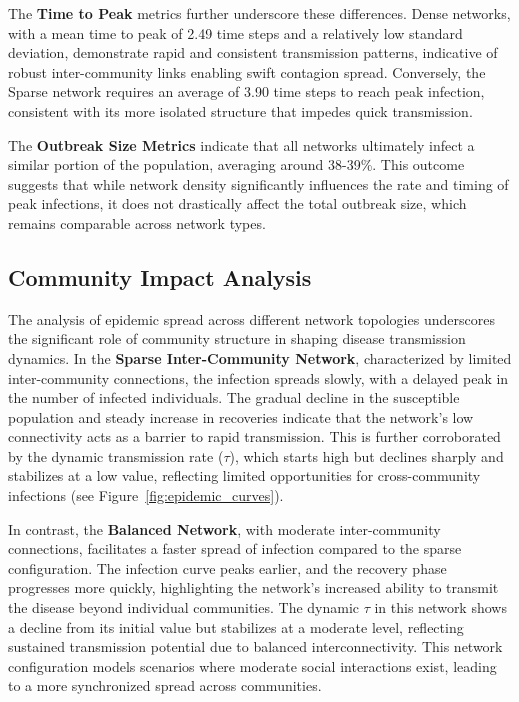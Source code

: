 \documentclass[12pt,a4paper]{article}
\begin{document}
The \textbf{Time to Peak} metrics further underscore these differences. Dense networks, with a mean time to peak of 2.49 time steps and a relatively low standard deviation, demonstrate rapid and consistent transmission patterns, indicative of robust inter-community links enabling swift contagion spread. Conversely, the Sparse network requires an average of 3.90 time steps to reach peak infection, consistent with its more isolated structure that impedes quick transmission.

The \textbf{Outbreak Size Metrics} indicate that all networks ultimately infect a similar portion of the population, averaging around 38-39\%. This outcome suggests that while network density significantly influences the rate and timing of peak infections, it does not drastically affect the total outbreak size, which remains comparable across network types.


\subsection{Community Impact Analysis}
The analysis of epidemic spread across different network topologies underscores the significant role of community structure in shaping disease transmission dynamics. In the \textbf{Sparse Inter-Community Network}, characterized by limited inter-community connections, the infection spreads slowly, with a delayed peak in the number of infected individuals. The gradual decline in the susceptible population and steady increase in recoveries indicate that the network's low connectivity acts as a barrier to rapid transmission. This is further corroborated by the dynamic transmission rate (\(\tau\)), which starts high but declines sharply and stabilizes at a low value, reflecting limited opportunities for cross-community infections (see Figure~\ref{fig:epidemic_curves}).

In contrast, the \textbf{Balanced Network}, with moderate inter-community connections, facilitates a faster spread of infection compared to the sparse configuration. The infection curve peaks earlier, and the recovery phase progresses more quickly, highlighting the network's increased ability to transmit the disease beyond individual communities. The dynamic \(\tau\) in this network shows a decline from its initial value but stabilizes at a moderate level, reflecting sustained transmission potential due to balanced interconnectivity. This network configuration models scenarios where moderate social interactions exist, leading to a more synchronized spread across communities.
\end{document}
